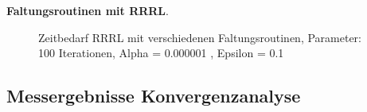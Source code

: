 \documentclass[a4paper,12pt]{article}
\begin{document}
\textbf{Faltungsroutinen mit RRRL}.

\begin{figure}[htbp]
\caption{Zeitbedarf RRRL mit verschiedenen Faltungsroutinen, Parameter: 100
Iterationen, Alpha = 0.000001 , Epsilon = 0.1 }%
\label{figure_zeit_rrrl}
\end{figure}










 
\subsection{Messergebnisse Konvergenzanalyse}
\end{document}

